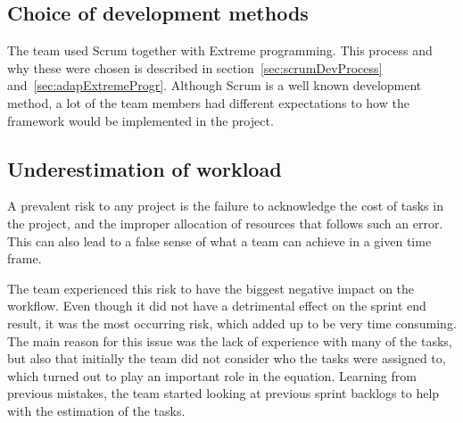 
\subsection{Choice of development methods}

The team used Scrum together with Extreme programming. This process and why these were chosen is described in section~\ref{sec:scrumDevProcess} and~\ref{sec:adapExtremeProgr}. Although Scrum is a well known development method, a lot of the team members had different expectations to how the framework would be implemented in the project.

\subsection{Underestimation of workload}
A prevalent risk to any project is the failure to acknowledge the cost of tasks in the project, and the improper allocation of resources that follows such an error. This can also lead to a false sense of what a team can achieve in a given time frame. 

The team experienced this risk to have the biggest negative impact on the workflow. Even though it did not have a detrimental effect on the sprint end result, it was the most occurring risk, which added up to be very time consuming. The main reason for this issue was the lack of experience with many of the tasks, but also that initially the team did not consider who the tasks were assigned to, which turned out to play an important role in the equation. Learning from previous mistakes, the team started looking at previous sprint backlogs to help with the estimation of the tasks.

